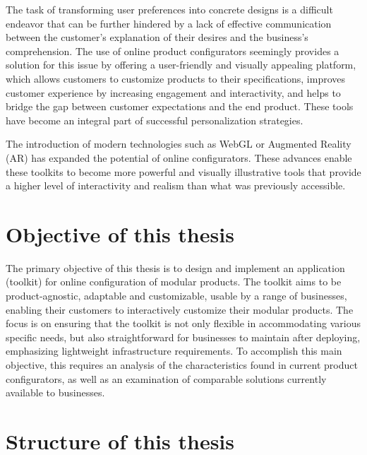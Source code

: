 The task of transforming user preferences into concrete designs is a difficult endeavor that can be further hindered by a lack of effective communication between the customer's explanation of their desires and the business's comprehension. The use of online product configurators seemingly provides a solution for this issue by offering a user-friendly and visually appealing platform, which allows customers to customize products to their specifications, improves customer experience by increasing engagement and interactivity, and helps to bridge the gap between customer expectations and the end product. These tools have become an integral part of successful personalization strategies. \cite{Franke2003}

The introduction of modern technologies such as WebGL or Augmented Reality (AR) has expanded the potential of online configurators. These advances enable these toolkits to become more powerful and visually illustrative tools that provide a higher level of interactivity and realism than what was previously accessible. \cite{Cozzi2015}

\section{Objective of this thesis}

The primary objective of this thesis is to design and implement an application (toolkit) for online configuration of modular products. The toolkit aims to be product-agnostic, adaptable and customizable, usable by a range of businesses, enabling their customers to interactively customize their modular products. The focus is on ensuring that the toolkit is not only flexible in accommodating various specific needs, but also straightforward for businesses to maintain after deploying, emphasizing lightweight infrastructure requirements. 
To accomplish this main objective, this requires an analysis of the characteristics found in current product configurators, as well as an examination of comparable solutions currently available to businesses.

\section{Structure of this thesis}

